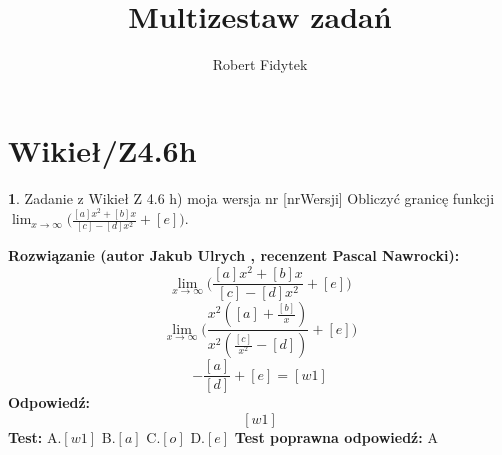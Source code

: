 \documentclass[12pt, a4paper]{article}
\title{Multizestaw zadań}
\author{Robert Fidytek}
\date{}
\theoremstyle{definition} %
\newtheorem{zad}{}
\newcommand{\kategoria}[1]{\section{#1}} %
\newcommand{\zadStart}[1]{\begin{zad}#1\newline} %
\newcommand{\zadStop}{\end{zad}}   %
\newcommand{\rozwStart}[2]{\noindent \textbf{Rozwiązanie (autor #1 , recenzent #2): }\newline} %
\newcommand{\rozwStop}{\newline}                                            %
\newcommand{\odpStart}{\noindent \textbf{Odpowiedź:}\newline}    %
\newcommand{\odpStop}{\newline}                                             %
\newcommand{\testStart}{\noindent \textbf{Test:}\newline} %
\newcommand{\testStop}{\newline} %
\newcommand{\kluczStart}{\noindent \textbf{Test poprawna odpowiedź:}\newline} %
\newcommand{\kluczStop}{\newline} %
\begin{document}
\maketitle


\kategoria{Wikieł/Z4.6h}
\zadStart{Zadanie z Wikieł Z 4.6 h) moja wersja nr [nrWersji]}
Obliczyć granicę funkcji $\lim_{x \to \infty}\bigg(\frac{[a]x^{2}+[b]x}{[c]-[d]x^{2}}+[e]\bigg)$.
\zadStop
\rozwStart{Jakub Ulrych}{Pascal Nawrocki}
$$\lim_{x \to \infty}\bigg(\frac{[a]x^{2}+[b]x}{[c]-[d]x^{2}}+[e]\bigg)$$
$$\lim_{x \to \infty}\bigg(\frac{x^{2}([a]+\frac{[b]}{x})}{x^{2}(\frac{[c]}{x^{2}}-[d])}+[e]\bigg)$$
$$-\frac{[a]}{[d]}+[e]=[w1]$$
\rozwStop
\odpStart
$$[w1]$$
\odpStop
\testStart
A.$[w1]$
B.$[a]$
C.$[o]$
D.$[e]$
\testStop
\kluczStart
A
\kluczStop
\end{document}
